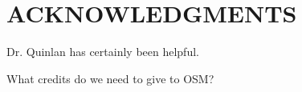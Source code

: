 \documentclass[letterpaper, 10 pt, conference]{ieeeconf}  %
\begin{document}

\section*{ACKNOWLEDGMENTS}

Dr. Quinlan has certainly been helpful.

What credits do we need to give to OSM?








\end{document}
